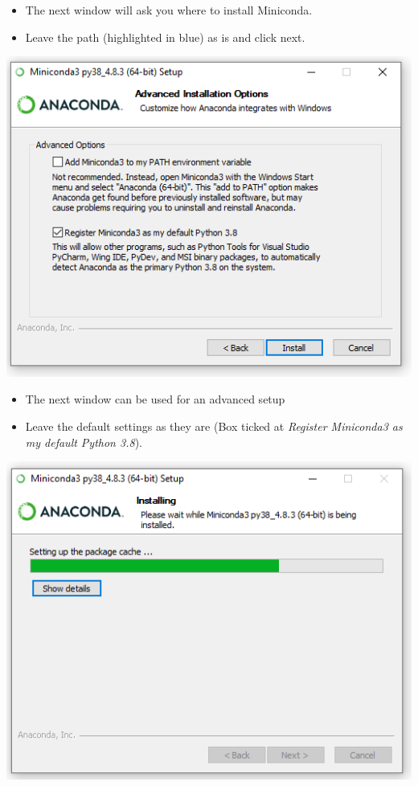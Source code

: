 \documentclass[
]{book}
\providecommand{\tightlist}{%
  \setlength{\itemsep}{0pt}\setlength{\parskip}{0pt}}
\begin{document}
\begin{itemize}
\tightlist
\item
  The next window will ask you where to install Miniconda.
\item
  Leave the path (highlighted in blue) as is and click next.
\end{itemize}

\begin{center}\includegraphics[width=7.18in]{figs/chp4/Inst_5} \end{center}

\begin{itemize}
\tightlist
\item
  The next window can be used for an advanced setup
\item
  Leave the default settings as they are (Box ticked at \emph{Register Miniconda3 as my default Python 3.8}).
\end{itemize}

\begin{center}\includegraphics[width=7.17in]{figs/chp4/Inst_6} \end{center}
\end{document}
